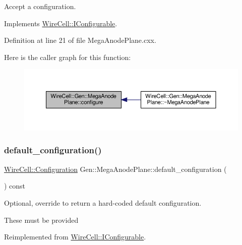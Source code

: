 Accept a configuration. 



Implements \hyperlink{class_wire_cell_1_1_i_configurable_a57ff687923a724093df3de59c6ff237d}{Wire\+Cell\+::\+I\+Configurable}.



Definition at line 21 of file Mega\+Anode\+Plane.\+cxx.

Here is the caller graph for this function\+:
\nopagebreak
\begin{figure}[H]
\begin{center}
\leavevmode
\includegraphics[width=350pt]{class_wire_cell_1_1_gen_1_1_mega_anode_plane_a68669a57b1f5baa35fdbcc259e230fb4_icgraph}
\end{center}
\end{figure}
\mbox{\label{class_wire_cell_1_1_gen_1_1_mega_anode_plane_a46b1dc962d2894307fa820da9ea5f663}} 
\subsubsection{\texorpdfstring{default\+\_\+configuration()}{default\_configuration()}}
{\footnotesize\ttfamily \hyperlink{namespace_wire_cell_a9f705541fc1d46c608b3d32c182333ee}{Wire\+Cell\+::\+Configuration} Gen\+::\+Mega\+Anode\+Plane\+::default\+\_\+configuration (\begin{DoxyParamCaption}{ }\end{DoxyParamCaption}) const\hspace{0.3cm}{\ttfamily [virtual]}}



Optional, override to return a hard-\/coded default configuration. 

These must be provided 

Reimplemented from \hyperlink{class_wire_cell_1_1_i_configurable_a54841b2da3d1ea02189478bff96f7998}{Wire\+Cell\+::\+I\+Configurable}.



